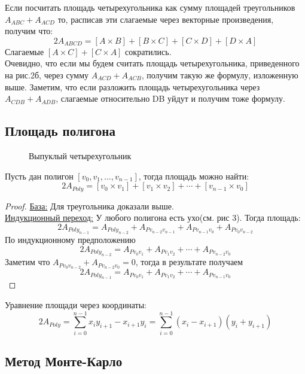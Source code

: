 Если посчитать площадь четырехугольника как сумму площадей треугольников $A_{ABC} + A_{ACD}$ то, расписав эти слагаемые через векторные произведения, получим что: $$2A_{ABCD} = [A \times B] + [B \times C] + [C \times D] + [D \times A]$$
Слагаемые $[A \times C] + [C \times A]$ сократились.\\

Очевидно, что если мы будем считать площадь четырехугольника, приведенного на рис.2б, через сумму $A_{ACD} + A_{ACB}$, получим такую же формулу, изложенную выше. Заметим, что если разложить площадь четырехугольника через $A_{CDB} + A_{ADB}$, слагаемые относительно DB уйдут и получим тоже формулу. 

\subsection{Площадь полигона}
\begin{figure}[h]
\caption{Выпуклый четырехугольник}
\end{figure}

\begin{theorem}
Пусть дан полигон $[v_0, v_1, \ldots, v_{n-1}]$, тогда площадь можно найти: 
$$
2A_{Poly} = [v_{0} \times v_{1}] + [v_{1} \times v_{2}] + \cdots + [v_{n-1} \times v_{0}]
$$
\begin{proof}
\uline {База:} Для треугольника доказали выше. \\
\uline {Индукционный переход:} У любого полигона есть ухо(см. рис 3). Тогда площадь:
$$
2A_{Poly_{n-1}} = A_{Poly_{n-2}} + A_{Pv_{n-2}v_{n-1}} + A_{Pv_{n-1}v_0} + A_{Pv_0v_{n-2}}
$$
По индукционному предположению 
$$
2A_{Poly_{n-2}} = A_{Pv_0v_1} + A_{Pv_1v_2} + \cdots + A_{Pv_{n-2}v_0}
$$
Заметим что $A_{Pv_0v_{n-2}} + A_{Pv_{n-2}v_0} = 0$, тогда в результате получаем
$$
2A_{Poly_{n-1}} = A_{Pv_0v_1} + A_{Pv_1v_2} + \cdots + A_{Pv_{n-1}v_0}
$$
\end{proof}
\end{theorem} 

\begin{corollary}
Уравнение площади через координаты: 
$$
2A_{Poly} = \sum_{i=0}^{n-1}x_iy_{i+1}-x_{i+1}y_i = \sum_{i=0}^{n-1}(x_i - x_{i+1})(y_i + y_{i+1})
$$
\end{corollary}

\subsection{Метод Монте-Карло}

